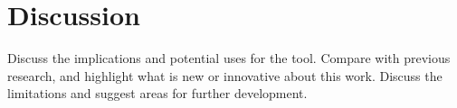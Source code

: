 \section{Discussion}
Discuss the implications and potential uses for the tool. Compare with previous research, and highlight what is new or innovative about this work. Discuss the limitations and suggest areas for further development.